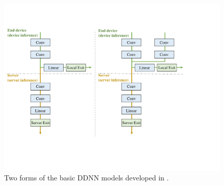 \documentclass[conference]{IEEEtran}
\def\figurename{Figure}
\begin{document}
%

	\begin{figure}[htb!]
        \centering

        \includegraphics[width=.9\columnwidth]{figure/DDNN_models.pdf}

        \caption{Two forms of the basic DDNN models developed in \cite{Teerapittayanon17}.}
        \label{fig:ddnnmodels} %
    \end{figure}
\end{document}
